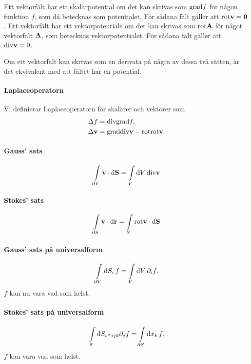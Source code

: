 Ett vektorfält har ett skalärpotential om det kan skrivas som $\text{grad}f$ för någon funktion $f$, som då betecknas som potentialet. För sådana fält gäller att $\text{rot}\vb{v} = \vb{0}$. Ett vektorfält har ett vektorpotentiale om det kan skrivas som $\text{rot}\vb{A}$ för något vektorfält $\vb{A}$, som betecknas vektorpotentialet. För sådana fält gäller att $\text{div}\vb{v} = 0$.

Om ett vektorfält kan skrivas som en derivata på några av dessa två sätten, är det ekvivalent med att fältet har en potential.

\paragraph{Laplaceoperatorn}
Vi definierar Laplaceoperatorn för skalärer och vektorer som
\begin{align*}
	\Delta f      &= \text{div}\text{grad}f, \\
	\Delta \vb{v} &= \text{grad}\text{div}\vb{v} - \text{rot}\text{rot}\vb{v}.
\end{align*}

\paragraph{Gauss' sats}
\begin{align*}
	\int\limits_{\partial V}\vb{v}\cdot\dd{\vb{S}} = \int\limits_{V}\dd{V}\text{div}\vb{v}
\end{align*}

\paragraph{Stokes' sats}
\begin{align*}
	\int\limits_{\partial S}\vb{v}\cdot\dd{\vb{r}} = \int\limits_{S}\text{rot}\vb{v}\cdot\dd{\vb{S}}
\end{align*}

\paragraph{Gauss' sats på universalform}
\begin{align*}
	\int\limits_{\partial V}\dd{S_i}f = \int\limits_{V}\dd{V}\partial_{i}f.
\end{align*}
$f$ kan nu vara vad som helst.

\paragraph{Stokes' sats på universalform}
\begin{align*}
	\int\limits_{S}\dd{S_i}\varepsilon_{ijk}\partial_{j}f = \int\limits_{\partial S}\dd{x_k}f.
\end{align*}
$f$ kan vara vad som helst.
